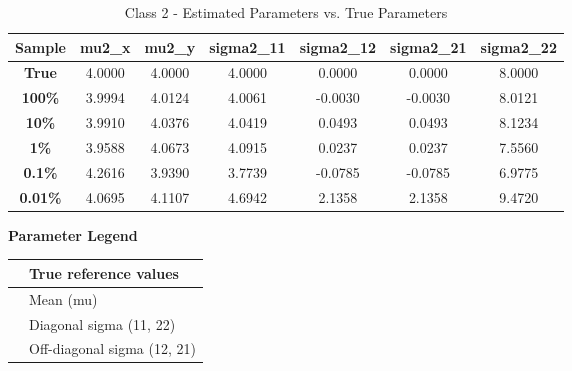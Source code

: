 \documentclass{article}
\begin{document}
\begin{table}[H]
\centering
\small
\caption{Class 2 - Estimated Parameters vs. True Parameters}
\vspace{0.5em}
\begin{tabular}{ccccccc}
\toprule
\textbf{Sample} & \textbf{mu2\_x} & \textbf{mu2\_y} & \textbf{sigma2\_11} & \textbf{sigma2\_12} & \textbf{sigma2\_21} & \textbf{sigma2\_22} \\
\midrule
\textbf{True} & \cellcolor{trueyellow} 4.0000 & \cellcolor{trueyellow} 4.0000 & \cellcolor{trueyellow} 4.0000 & \cellcolor{trueyellow} 0.0000 & \cellcolor{trueyellow} 0.0000 & \cellcolor{trueyellow} 8.0000 \\
\textbf{100\%} & \cellcolor{meangreen} 3.9994 & \cellcolor{meangreen} 4.0124 & \cellcolor{sigmablue} 4.0061 & \cellcolor{offpurple} -0.0030 & \cellcolor{offpurple} -0.0030 & \cellcolor{sigmablue} 8.0121 \\
\textbf{10\%} & \cellcolor{meangreen} 3.9910 & \cellcolor{meangreen} 4.0376 & \cellcolor{sigmablue} 4.0419 & \cellcolor{offpurple} 0.0493 & \cellcolor{offpurple} 0.0493 & \cellcolor{sigmablue} 8.1234 \\
\textbf{1\%} & \cellcolor{meangreen} 3.9588 & \cellcolor{meangreen} 4.0673 & \cellcolor{sigmablue} 4.0915 & \cellcolor{offpurple} 0.0237 & \cellcolor{offpurple} 0.0237 & \cellcolor{sigmablue} 7.5560 \\
\textbf{0.1\%} & \cellcolor{meangreen} 4.2616 & \cellcolor{meangreen} 3.9390 & \cellcolor{sigmablue} 3.7739 & \cellcolor{offpurple} -0.0785 & \cellcolor{offpurple} -0.0785 & \cellcolor{sigmablue} 6.9775 \\
\textbf{0.01\%} & \cellcolor{meangreen} 4.0695 & \cellcolor{meangreen} 4.1107 & \cellcolor{sigmablue} 4.6942 & \cellcolor{offpurple} 2.1358 & \cellcolor{offpurple} 2.1358 & \cellcolor{sigmablue} 9.4720 \\
\bottomrule
\end{tabular}
\end{table}

\begin{center}
\textbf{Parameter Legend} \\
\begin{tabular}{|l|l|}
\hline
\cellcolor{trueyellow} & True reference values \\ \hline
\cellcolor{meangreen} & Mean (mu) \\ \hline
\cellcolor{sigmablue} & Diagonal sigma (11, 22) \\ \hline
\cellcolor{offpurple} & Off-diagonal sigma (12, 21) \\ \hline
\end{tabular}
\end{center}
\end{document}
